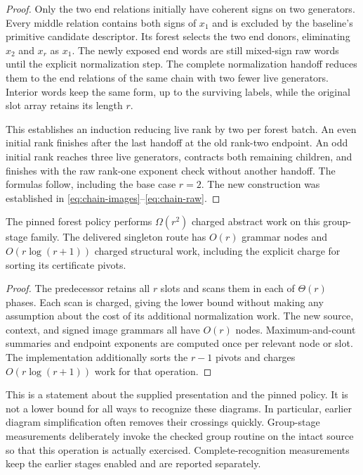 \begin{proof}
Only the two end relations initially have coherent signs on two generators.
Every middle relation contains both signs of $x_1$ and is excluded by the
baseline's primitive candidate descriptor. Its forest selects the two end
donors, eliminating $x_2$ and $x_r$ as $x_1$. The newly exposed end words
are still mixed-sign raw words until the explicit normalization step.
The complete normalization handoff reduces them to the end relations of
the same chain with two fewer live generators. Interior words keep the
same form, up to the surviving labels, while the original slot array
retains its length $r$.

This establishes an induction reducing live rank by two per forest batch.
An even initial rank finishes after the last handoff at the old rank-two
endpoint. An odd initial rank reaches three live generators, contracts
both remaining children, and finishes with the raw rank-one exponent
check without another handoff. The formulas follow, including the base
case $r=2$. The new construction was established in
\eqref{eq:chain-images}--\eqref{eq:chain-raw}.
\end{proof}

\begin{corollary}
\label{cor:family-work}
The pinned forest policy performs $\Omega(r^2)$ charged abstract work on
this group-stage family. The delivered singleton route has $O(r)$ grammar
nodes and $O(r\log(r+1))$ charged structural work, including the explicit
charge for sorting its certificate pivots.
\end{corollary}

\begin{proof}
The predecessor retains all $r$ slots and scans them in each of
$\Theta(r)$ phases. Each scan is charged, giving the lower bound without
making any assumption about the cost of its additional normalization work.
The new source, context, and signed image grammars all have $O(r)$ nodes.
Maximum-and-count summaries and endpoint exponents are computed once per
relevant node or slot. The implementation additionally sorts the $r-1$
pivots and charges $O(r\log(r+1))$ work for that operation.
\end{proof}

This is a statement about the supplied presentation and the pinned policy.
It is not a lower bound for all ways to recognize these diagrams. In
particular, earlier diagram simplification often removes their crossings
quickly. Group-stage measurements deliberately invoke the checked group
routine on the intact source so that this operation is actually exercised.
Complete-recognition measurements keep the earlier stages enabled and are
reported separately.

